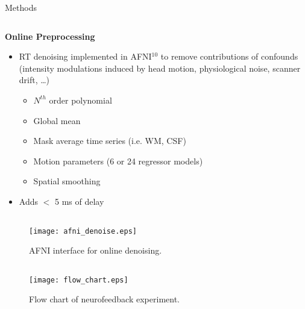 \documentclass[final,hyperref={pdfpagelabels=false}]{beamer}
\begin{document}
\begin{frame}
\begin{columns}
\begin{column}{.5\textwidth}
{\begin{block}{Methods}
                \begin{column}{.48\textwidth}
                {\bf Online Preprocessing}
                \begin{itemize}
                    \item RT denoising implemented in AFNI$^{10}$ to remove contributions of confounds (intensity modulations induced by head motion, physiological noise, scanner drift, \dots)
                    \begin{itemize}
                        \item $N^{th}$ order polynomial
                        \item Global mean
                        \item Mask average time series (i.e. WM, CSF)
                        \item Motion parameters (6 or 24 regressor models)
                        \item Spatial smoothing
                    \end{itemize}
                   \item Adds $<$ 5 ms of delay
                \end{itemize}
                \end{column}
                \begin{column}{.50\textwidth}
                    \begin{figure}
                        \begin{center}
                            \texttt{[image: afni\_denoise.eps]}
                        \end{center}
                        \caption{\label{fig:afni_denoise}AFNI interface for online denoising.}
                    \end{figure}
                \end{column}
            \begin{figure}
                \begin{center}
                    \texttt{[image: flow\_chart.eps]}
                \end{center}
                \caption{\label{fig:processingflow}Flow chart of neurofeedback experiment.}
            \end{figure}    
            \vfill              
            \end{block}
          }
    \end{column}


\end{columns}
\end{frame}
\end{document}
